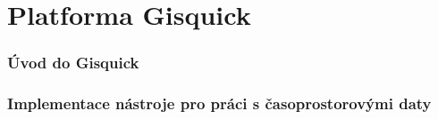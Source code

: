 \newpage
\part{Platforma Gisquick}
\newpage

\section{Úvod do Gisquick}

\section{Implementace nástroje pro práci s časoprostorovými daty}

